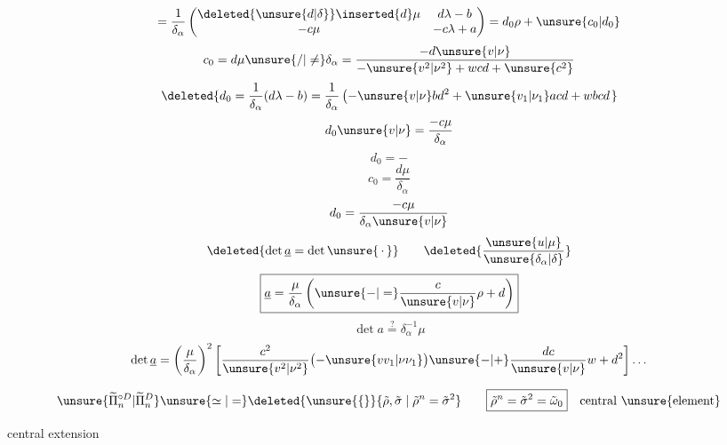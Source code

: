 \[
=\frac{1}{\delta_\alpha}
\begin{pmatrix}
\deleted{\unsure{d|\delta}}\inserted{d}\mu&d\lambda-b\\
-c\mu&-c\lambda+a
\end{pmatrix}
=d_0\rho+\unsure{c_0|d_0}
\]
\[
c_0=d\mu\unsure{/|\ne}\delta_\alpha
=\frac{-d\unsure{v|\nu}}{-\unsure{v^2|\nu^2}+wcd+\unsure{c^2}}
\]
\[
\deleted{
d_0=\frac{1}{\delta_\alpha}(d\lambda-b)
=\frac{1}{\delta_\alpha}
\left(-\unsure{v|\nu}bd^2+\unsure{v_1|\nu_1}acd+w bcd\right.
}
\]
\[
d_0\unsure{v|\nu}=\frac{-c\mu}{\delta_\alpha}
\]
\[
d_0=-
\]
\[
c_0=\frac{d\mu}{\delta_\alpha}
\]
\[
d_0=\frac{-c\mu}{\delta_\alpha\unsure{v|\nu}}
\]
\[
\deleted{\det\underline{a}=\det\unsure{\,\cdot\,}}
\qquad
\deleted{\frac{\unsure{u|\mu}}{\unsure{\delta_\alpha|\delta}}}
\]
\[
\boxed{\underline{a}=\frac{\mu}{\delta_\alpha}
\left(\unsure{-|=}\frac{c}{\unsure{v|\nu}}\rho+d\right)}
\]
\[
\det a\overset{?}{=}\delta_\alpha^{-1}\mu
\]
\[
\det\underline{a}=\left(\frac{\mu}{\delta_\alpha}\right)^2
\left[\frac{c^2}{\unsure{v^2|\nu^2}}
\bigl(-\unsure{vv_1|\nu\nu_1}\bigr)
\unsure{-|+}\frac{dc}{\unsure{v|\nu}}w+d^2\right]\ldots
\]



\[
\unsure{\widetilde{\Pi}_n^{\circ D}|\widetilde{\Pi}_n^D}
\unsure{\simeq|=}
\deleted{\unsure{\{}}
\{\tilde\rho,\tilde\sigma\mid\tilde\rho^n=\tilde\sigma^2\}
\qquad
\boxed{\tilde\rho^n=\tilde\sigma^2=\tilde\omega_0}
\quad\text{central \unsure{element}}
\]

central extension

